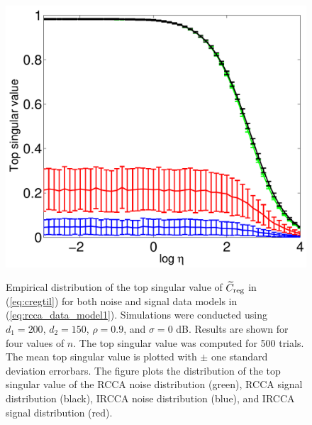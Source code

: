\begin{figure}[h!]
{\includegraphics[width=\figwidth]{figures/ircca_errorbars_low_snr_n_300.pdf} 
} 
\caption{Empirical distribution of the top singular value of $\widetilde{C}_{\text{reg}}$ in
  (\ref{eq:cregtil}) for both noise and signal data models in
  (\ref{eq:rcca_data_model1}). Simulations were conducted using $d_1=200$, $d_2=150$,
  $\rho=0.9$, and $\sigma=0$ dB. Results are shown for four values of $n$. The top
  singular value was computed for 500 trials. The mean top singular value is plotted with
  $\pm$ one standard deviation errorbars. The figure plots the distribution of the top
  singular value of the RCCA noise distribution (green), RCCA signal distribution (black),
  IRCCA noise distribution (blue), and IRCCA signal distribution (red).}
\label{fig:rcca_errorbars_low_snr}
\end{figure}

